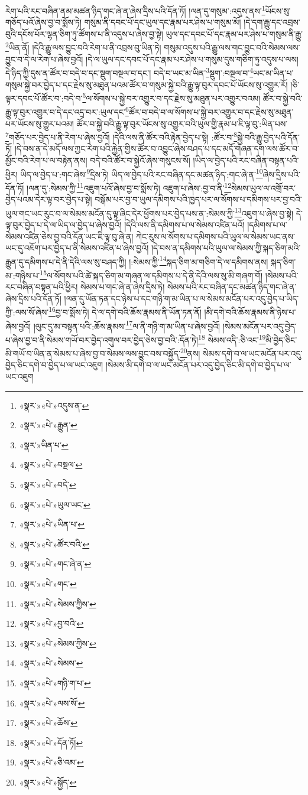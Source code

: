 རེག་པའི་རང་བཞིན་ནམ་མཚན་ཉིད་གང་ཞེ་ན་ཞེས་དྲིས་པའི་དོན་ཏོ། །ལན་དུ་གསུམ་:འདུས་ནས་\footnote{«སྣར་»«པེ་»འདུས་ན་}ཡོངས་སུ་གཅོད་པའོ་ཞེས་བྱ་བ་སྨོས་ཏེ། གསུམ་ནི་དབང་པོ་དང་ཡུལ་དང་རྣམ་པར་ཤེས་པ་གསུམ་མོ། །དེ་དག་རྒྱུ་དང་འབྲས་བུའི་དངོས་པོར་ལྷན་ཅིག་ཏུ་ཚོགས་པ་ནི་འདུས་པ་ཞེས་བྱ་སྟེ། ཡུལ་དང་དབང་པོ་དང་རྣམ་པར་ཤེས་པ་གསུམ་ནི་རྒྱུ་\footnote{«སྣར་»«པེ་»རྒྱུན་}ཡིན་ནོ། །དེའི་རྒྱུ་ལས་བྱུང་བའི་རེག་པ་ནི་འབྲས་བུ་ཡིན་ཏེ། གསུམ་འདུས་པའི་རྒྱུ་ལས་གང་བྱུང་བའི་སེམས་ལས་བྱུང་བ་དེ་ལ་རེག་པ་ཞེས་བྱའོ། །དེ་ལ་ཡུལ་དང་དབང་པོ་དང་རྣམ་པར་ཤེས་པ་གསུམ་དུས་གཅིག་ཏུ་འདུས་པ་ལས། དེ་ཉིད་ཀྱི་དུས་ན་ཚོར་བ་བདེ་བ་དང་སྡུག་བསྔལ་བ་དང་། བདེ་བ་ཡང་མ་ཡིན་\footnote{«སྣར་»ཡིན་པ་}སྡུག་:བསྔལ་བ་\footnote{«སྣར་»«པེ་»བསྔལ་}ཡང་མ་ཡིན་པ་གསུམ་སྐྱེ་བར་བྱེད་པ་དང་རྗེས་སུ་མཐུན་པའམ་ཚོར་བ་གསུམ་སྐྱེ་བའི་རྒྱུ་ལྟ་བུར་དབང་པོ་ཡོངས་སུ་འགྱུར་རོ། །ཅི་ལྟར་དབང་པོ་ཚོར་བ་:བདེ་བ་\footnote{«སྣར་»«པེ་»བདེ་}ལ་སོགས་པ་སྐྱེ་བར་འགྱུར་བ་དང་རྗེས་སུ་མཐུན་པར་འགྱུར་བའམ། ཚོར་བ་སྐྱེ་བའི་རྒྱུ་ལྟ་བུར་འགྱུར་བ་དེ་དང་འདྲ་བར་:ཡུལ་དང་\footnote{«སྣར་»«པེ་»ཡུལ་ཡང་}ཚོར་བ་བདེ་བ་ལ་སོགས་པ་སྐྱེ་བར་འགྱུར་བ་དང་རྗེས་སུ་མཐུན་པར་ཡོངས་སུ་གྱུར་པའམ། ཚོར་བ་སྐྱེ་བའི་རྒྱུ་ལྟ་བུར་ཡོངས་སུ་འགྱུར་བའི་ཡུལ་གྱི་རྣམ་པ་ཇི་ལྟ་བུ་:ཡིན་པས་\footnote{«སྣར་»«པེ་»ཡིན་པ་}གཅོད་པར་བྱེད་པ་ནི་རེག་པ་ཞེས་བྱའོ། །དེའི་ལས་ནི་ཚོར་བའི་རྟེན་བྱེད་པ་སྟེ། :ཚོར་བ་\footnote{«སྣར་»«པེ་»ཚོར་བའི་}སྐྱེ་བའི་རྒྱུ་བྱེད་པའི་དོན་ཏོ། །དེ་བས་ན་དེ་མདོ་ལས་ཀྱང་རེག་པའི་རྐྱེན་གྱིས་ཚོར་བ་འབྱུང་ཞེས་བཤད་པ་དང་མདོ་གཞན་དག་ལས་ཚོར་བ་མྱོང་བའི་རེག་པ་ལ་བརྟེན་ནས། བདེ་བའི་ཚོར་བ་སྐྱེའོ་ཞེས་གསུངས་སོ། །ཡིད་ལ་བྱེད་པའི་རང་བཞིན་བསྟན་པའི་ཕྱིར། ཡིད་ལ་བྱེད་པ་:གང་ཞེས་\footnote{«སྣར་»«པེ་»གང་ཞེ་ན་}དྲིས་ཏེ། ཡིད་ལ་བྱེད་པའི་རང་བཞིན་དང་མཚན་ཉིད་:གང་ཞེ་ན་\footnote{«སྣར་»«པེ་»གང་}ཞེས་དྲིས་པའི་དོན་ཏོ། །ལན་དུ་:སེམས་ཀྱི་\footnote{«སྣར་»«པེ་»སེམས་ཀྱིས་}འཇུག་པའོ་ཞེས་བྱ་བ་སྨོས་ཏེ། འཇུག་པ་ཞེས་:བྱ་བ་ནི་\footnote{«སྣར་»«པེ་»བྱ་བའི་}སེམས་ཡུལ་ལ་འགྲོ་བར་བྱེད་པའམ་དེར་ལྟ་བར་བྱེད་པ་སྟེ། བསྒོམ་པར་བྱ་བ་ཡུལ་དམིགས་པའི་ཁྱད་པར་ལ་སོགས་པ་དམིགས་པར་བྱ་བའི་ཡུལ་གང་ཡང་རུང་བ་ལ་སེམས་མངོན་དུ་ལྟ་ཞིང་དེར་ཕྱོགས་པར་བྱེད་པས་ན་:སེམས་ཀྱི་\footnote{«སྣར་»«པེ་»སེམས་ཀྱིས་}འཇུག་པ་ཞེས་བྱ་སྟེ། དེ་ལྟ་བུར་བྱེད་པ་དེ་ལ་ཡིད་ལ་བྱེད་པ་ཞེས་བྱའོ། །དེའི་ལས་ནི་དམིགས་པ་ལ་སེམས་འཛིན་པའོ། །དམིགས་པ་ལ་སེམས་འཛིན་ཅེས་བྱ་བའི་དོན་ཡང་ཇི་ལྟ་བུ་ཞེ་ན། ཀེང་རུས་ལ་སོགས་པ་དམིགས་པའི་ཡུལ་ལ་སེམས་ཡང་ནས་ཡང་དུ་འཇོག་པར་བྱེད་པ་ནི་སེམས་འཛིན་པ་ཞེས་བྱའོ། །དེ་བས་ན་དམིགས་པའི་ཡུལ་ལ་སེམས་ཀྱི་སྐད་ཅིག་མའི་རྒྱུན་དུ་དམིགས་པ་དེ་ནི་དེའི་ལས་སུ་བཤད་ཀྱི། །:སེམས་ཀྱི་\footnote{«སྣར་»«པེ་»སེམས་}སྐད་ཅིག་མ་གཅིག་དེ་ལ་དམིགས་ནས། སྐད་ཅིག་མ་:གཉིས་པ་\footnote{«སྣར་»«པེ་»གཉི་ག་པ་}ལ་སོགས་པའི་ཚེ་སྐད་ཅིག་མ་གཞན་ལ་དམིགས་པ་དེ་ནི་དེའི་ལས་སུ་མི་གཞག་གོ། །སེམས་པའི་རང་བཞིན་བསྟན་པའི་ཕྱིར། སེམས་པ་གང་ཞེ་ན་ཞེས་དྲིས་ཏེ། སེམས་པའི་རང་བཞིན་དང་མཚན་ཉིད་གང་ཞེ་ན་ཞེས་དྲིས་པའི་དོན་ཏོ། །ལན་དུ་ཡོན་ཏན་དང་ཉེས་པ་དང་གཉི་ག་མ་ཡིན་པ་ལ་སེམས་མངོན་པར་འདུ་བྱེད་པ་ཡིད་ཀྱི་:ལས་སོ་ཞེས་\footnote{«སྣར་»«པེ་»ལས་སོ་}བྱ་བ་སྨོས་ཏེ། དེ་ལ་དགེ་བའི་ཆོས་རྣམས་ནི་ཡོན་ཏན་ནོ། །མི་དགེ་བའི་ཆོས་རྣམས་ནི་ཉེས་པ་ཞེས་བྱའོ། །ལུང་དུ་མ་བསྟན་པའི་:ཆོས་རྣམས་\footnote{«སྣར་»«པེ་»ཆོས་}ལ་ནི་གཉི་ག་མ་ཡིན་པ་ཞེས་བྱའོ། །སེམས་མངོན་པར་འདུ་བྱེད་པ་ཞེས་བྱ་བ་ནི་སེམས་གཡོ་བར་བྱེད་འགུལ་བར་བྱེད་ཅེས་བྱ་བའི་:དོན་ཏེ།\footnote{«སྣར་»«པེ་»དོན་ཏོ།} སེམས་འདི་:ཅི་འང་\footnote{«སྣར་»«པེ་»ཅི་འམ་}མི་བྱེད་ཅིང་མི་གཡོ་བ་ཡིན་ན་སེམས་པ་ཞེས་བྱ་བ་སེམས་ལས་བྱུང་བས་བསྐྱོད་\footnote{«སྣར་»«པེ་»སྐྱོད་}ནས། སེམས་དགེ་བ་ལ་ཡང་མངོན་པར་འདུ་བྱེད་ཅིང་དགེ་བ་བྱེད་པ་ལ་ཡང་འཇུག །སེམས་མི་དགེ་བ་ལ་ཡང་མངོན་པར་འདུ་བྱེད་ཅིང་མི་དགེ་བ་བྱེད་པ་ལ་ཡང་འཇུག 